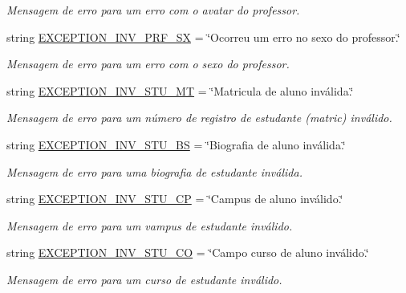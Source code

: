 \begin{DoxyCompactItemize}
\begin{DoxyCompactList}\small\item\em Mensagem de erro para um erro com o avatar do professor. \end{DoxyCompactList}\item 
string \hyperlink{namespaceELO_1_1lang_1_1pt__br_adb286bfeeed3ed5c7e8c5cccd5238267}{E\-X\-C\-E\-P\-T\-I\-O\-N\-\_\-\-I\-N\-V\-\_\-\-P\-R\-F\-\_\-\-S\-X} = \char`\"{}Ocorreu um erro no sexo do professor.\char`\"{}
\begin{DoxyCompactList}\small\item\em Mensagem de erro para um erro com o sexo do professor. \end{DoxyCompactList}\item 
string \hyperlink{namespaceELO_1_1lang_1_1pt__br_ad7e77e402e9c4b2f6c69b19f1609a0d5}{E\-X\-C\-E\-P\-T\-I\-O\-N\-\_\-\-I\-N\-V\-\_\-\-S\-T\-U\-\_\-\-M\-T} = \char`\"{}Matricula de aluno inválida.\char`\"{}
\begin{DoxyCompactList}\small\item\em Mensagem de erro para um número de registro de estudante (matric) inválido. \end{DoxyCompactList}\item 
string \hyperlink{namespaceELO_1_1lang_1_1pt__br_a0a02d44f930b2512d0c6c6427b7d4134}{E\-X\-C\-E\-P\-T\-I\-O\-N\-\_\-\-I\-N\-V\-\_\-\-S\-T\-U\-\_\-\-B\-S} = \char`\"{}Biografia de aluno inválida.\char`\"{}
\begin{DoxyCompactList}\small\item\em Mensagem de erro para uma biografia de estudante inválida. \end{DoxyCompactList}\item 
string \hyperlink{namespaceELO_1_1lang_1_1pt__br_aa53f08869c52a18d80e91d5f99ae78d2}{E\-X\-C\-E\-P\-T\-I\-O\-N\-\_\-\-I\-N\-V\-\_\-\-S\-T\-U\-\_\-\-C\-P} = \char`\"{}Campus de aluno inválido.\char`\"{}
\begin{DoxyCompactList}\small\item\em Mensagem de erro para um vampus de estudante inválido. \end{DoxyCompactList}\item 
string \hyperlink{namespaceELO_1_1lang_1_1pt__br_a01d98907a99d20db757c8e9794138525}{E\-X\-C\-E\-P\-T\-I\-O\-N\-\_\-\-I\-N\-V\-\_\-\-S\-T\-U\-\_\-\-C\-O} = \char`\"{}Campo curso de aluno inválido.\char`\"{}
\begin{DoxyCompactList}\small\item\em Mensagem de erro para um curso de estudante inválido. \end{DoxyCompactList}\item 

\end{DoxyCompactItemize}

